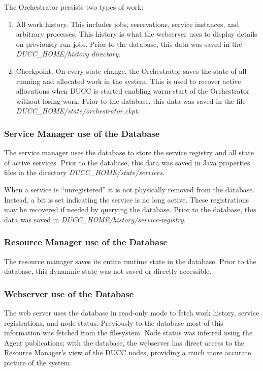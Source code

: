    The Orchestrator persists two types of work:
    \begin{enumerate}
      \item All work history.  This includes jobs, reservations, service instances, and 
        arbitrary processes.  This history is what the webserver uses to display details
        on previously run jobs.  Prior to the database, this data was saved in the
        {\em DUCC\_HOME/history directory}.
      \item Checkpoint.  On every state change, the Orchestrator saves the state of 
        all running and allocated work in the system.  This is used to recover active allocations
        when DUCC is started enabling warm-start of the Orchestrator without losing work.
        Prior to the database, this data was saved in the file {\em DUCC\_HOME/state/orchestrator.ckpt}.
    \end{enumerate}
    
    \subsubsection{Service Manager use of the Database}
    The service manager uses the database to store the service registry and all state
    of active services.  Prior to the database, this data was saved in Java properties files
    in the directory {\em DUCC\_HOME/state/services}.

    When a service is ``unregistered'' it is not physically removed from the database.  Instead,
    a bit is set indicating the service is no long active.  These registrations may be
    recovered if needed by querying the database.  Prior to the database, this data was saved
    in {\em DUCC\_HOME/history/service-registry}.

    \subsubsection{Resource Manager use of the Database}
    The resource manager saves its entire runtime state in the database.  Prior to the
    database, this dynamnic state was not saved or directly accessible.

    \subsubsection{Webserver use of the Database}
    The web server uses the database in read-only mode to fetch work history, service
    registrations, and node status.  Previously to the database most of this information
    was fetched from the filesystem.  Node status was inferred using the Agent publications;
    with the database, the webserver has direct access to the Resource Manager's view of the
    DUCC nodes, providing a much more accurate picture of the system.
  
